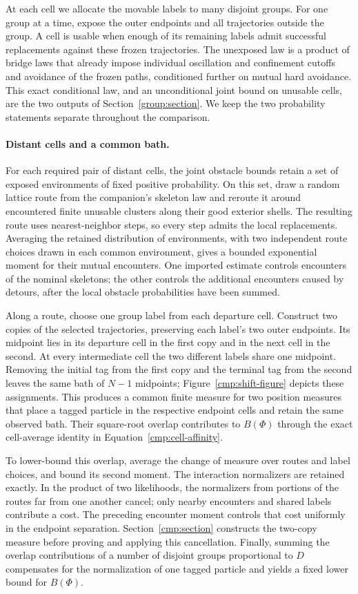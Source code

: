 At each cell we allocate the movable labels to many disjoint groups.
For one group at a time, expose the outer endpoints and all trajectories
outside the group. A cell is usable when enough of its remaining labels
admit successful replacements against these frozen trajectories. The
unexposed law is a product of bridge laws that already impose individual
oscillation and confinement cutoffs and avoidance of the frozen paths,
conditioned further on mutual hard avoidance. This exact conditional law, and an unconditional joint
bound on unusable cells, are the two outputs of
Section~\ref{group:section}. We keep the two probability statements
separate throughout the comparison.

\paragraph{Distant cells and a common bath.}
For each required pair of distant cells, the joint obstacle bounds retain
a set of exposed environments of fixed positive probability. On this set,
draw a random lattice route from the companion's skeleton law and reroute
it around encountered finite unusable clusters along their good exterior
shells. The resulting route uses nearest-neighbor steps, so every step
admits the local replacements. Averaging the retained distribution of environments, with two independent
route choices drawn in each common environment, gives a bounded exponential
moment for their mutual encounters. One imported estimate controls encounters of the nominal skeletons; the other
controls the additional encounters caused by detours, after the local
obstacle probabilities have been summed.

Along a route, choose one group label from each departure cell. Construct
two copies of the selected trajectories, preserving each label's two outer
endpoints. Its midpoint lies in its departure cell in the first copy and
in the next cell in the second. At every intermediate cell the two different
labels share one midpoint. Removing the initial tag from the first copy
and the terminal tag from the second leaves the same bath of $N-1$
midpoints; Figure~\ref{cmp:shift-figure} depicts these assignments.
This produces a common finite measure for two position measures that place
a tagged particle in the respective endpoint cells and retain the same
observed bath. Their square-root overlap contributes to $B(\Phi)$ through the exact cell-average identity in
Equation~\eqref{cmp:cell-affinity}.

To lower-bound this overlap, average the change of measure over routes
and label choices, and bound its second moment. The interaction
normalizers are retained exactly. In the product of two likelihoods,
the normalizers from portions of the routes far from one another cancel;
only nearby encounters and shared labels contribute a cost. The preceding
encounter moment controls that cost uniformly in the endpoint separation.
Section~\ref{cmp:section} constructs the two-copy measure before proving
and applying this cancellation. Finally, summing the overlap contributions
of a number of disjoint groups proportional to $D$ compensates for the
normalization of one tagged particle and yields a fixed lower bound for
$B(\Phi)$.

